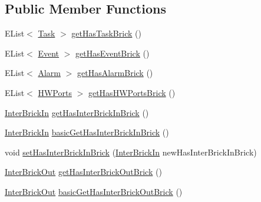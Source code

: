\subsection*{Public Member Functions}
\begin{DoxyCompactItemize}
\item 
E\-List$<$ \hyperlink{interfaceshootingmachineemfmodel_1_1_task}{Task} $>$ \hyperlink{classshootingmachineemfmodel_1_1impl_1_1_brick_impl_a31e7ecea8f97c7c733ba4ecf8589efc5}{get\-Has\-Task\-Brick} ()
\item 
E\-List$<$ \hyperlink{interfaceshootingmachineemfmodel_1_1_event}{Event} $>$ \hyperlink{classshootingmachineemfmodel_1_1impl_1_1_brick_impl_a57a8d0eb0228c2f91f38d58ea6e092ac}{get\-Has\-Event\-Brick} ()
\item 
E\-List$<$ \hyperlink{interfaceshootingmachineemfmodel_1_1_alarm}{Alarm} $>$ \hyperlink{classshootingmachineemfmodel_1_1impl_1_1_brick_impl_a850d537faaa42e077de53bed8e629a19}{get\-Has\-Alarm\-Brick} ()
\item 
E\-List$<$ \hyperlink{interfaceshootingmachineemfmodel_1_1_h_w_ports}{H\-W\-Ports} $>$ \hyperlink{classshootingmachineemfmodel_1_1impl_1_1_brick_impl_aab300b09314059764d15304583bebebb}{get\-Has\-H\-W\-Ports\-Brick} ()
\item 
\hyperlink{interfaceshootingmachineemfmodel_1_1_inter_brick_in}{Inter\-Brick\-In} \hyperlink{classshootingmachineemfmodel_1_1impl_1_1_brick_impl_a5fe98ab17b520113cdf2ac590a74472a}{get\-Has\-Inter\-Brick\-In\-Brick} ()
\item 
\hyperlink{interfaceshootingmachineemfmodel_1_1_inter_brick_in}{Inter\-Brick\-In} \hyperlink{classshootingmachineemfmodel_1_1impl_1_1_brick_impl_a659e21f9f557086c40549040a149a05b}{basic\-Get\-Has\-Inter\-Brick\-In\-Brick} ()
\item 
void \hyperlink{classshootingmachineemfmodel_1_1impl_1_1_brick_impl_a1f37c1181022c1ac21bc6625f184c797}{set\-Has\-Inter\-Brick\-In\-Brick} (\hyperlink{interfaceshootingmachineemfmodel_1_1_inter_brick_in}{Inter\-Brick\-In} new\-Has\-Inter\-Brick\-In\-Brick)
\item 
\hyperlink{interfaceshootingmachineemfmodel_1_1_inter_brick_out}{Inter\-Brick\-Out} \hyperlink{classshootingmachineemfmodel_1_1impl_1_1_brick_impl_ac5c3b5d60e475bbfdeaae00ca253a7bf}{get\-Has\-Inter\-Brick\-Out\-Brick} ()
\item 
\hyperlink{interfaceshootingmachineemfmodel_1_1_inter_brick_out}{Inter\-Brick\-Out} \hyperlink{classshootingmachineemfmodel_1_1impl_1_1_brick_impl_aef301b3b8a6c7743bce352a491b0676b}{basic\-Get\-Has\-Inter\-Brick\-Out\-Brick} ()

\end{DoxyCompactItemize}
